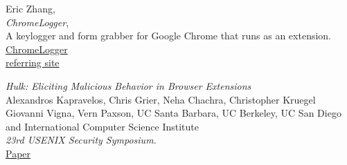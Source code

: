 \documentclass[12pt]{article}
\begin{document}
\begin{multicols}{2}
\begin{thebibliography}{4}
	Eric Zhang,\\
	\emph{ChromeLogger},\\
A keylogger and form grabber for Google Chrome that runs as an extension.\\
\href{https://github.com/Xeroday/ChromeLogger}{ChromeLogger}\\
\href{https://www.ericzhang.me/projects/chromelogger/}{referring site}

\emph{Hulk: Eliciting Malicious Behavior in Browser Extensions}\\
Alexandros Kapravelos, Chris Grier, Neha Chachra, Christopher Kruegel
Giovanni Vigna, Vern Paxson,
UC Santa Barbara,
UC Berkeley, 
UC San Diego and 
International Computer Science Institute\\
\emph{23rd USENIX Security Symposium.}\\
\href{https://www.usenix.org/system/files/conference/usenixsecurity14/sec14-paper-kapravelos.pdf}{Paper}\\

\end{thebibliography}
\end{multicols}
 
\end{document}
